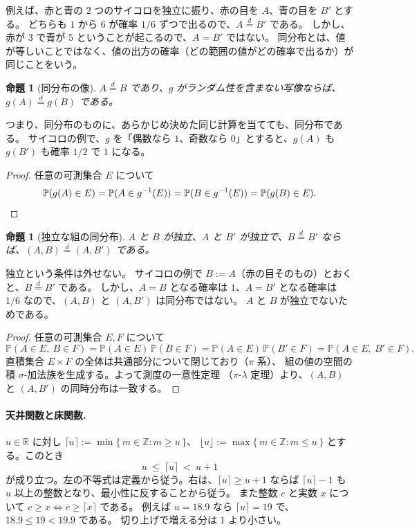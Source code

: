 \documentclass[a4paper,11pt]{jsarticle}
\theoremstyle{definition}
\theoremstyle{plain}
\newtheorem{proposition}[definition]{命題}
\theoremstyle{remark}
\newcommand{\Prob}{\mathbb{P}}
\newcommand{\Real}{\mathbb{R}}
\newcommand{\eqd}{\overset{d}{=}}               %
\begin{document}
例えば、赤と青の $2$ つのサイコロを独立に振り、赤の目を $A$、青の目を $B'$ とする。
どちらも $1$ から $6$ が確率 $1/6$ ずつで出るので、$A\eqd B'$ である。
しかし、赤が $3$ で青が $5$ ということが起こるので、$A=B'$ ではない。
同分布とは、値が等しいことではなく、値の出方の確率（どの範囲の値がどの確率で出るか）が同じことをいう。

\begin{proposition}[同分布の像]
  \label{prop:image}
  $A\eqd B$ であり、$g$ がランダム性を含まない写像ならば、$g(A)\eqd g(B)$ である。
\end{proposition}

つまり、同分布のものに、あらかじめ決めた同じ計算を当てても、同分布である。
サイコロの例で、$g$ を「偶数なら $1$、奇数なら $0$」とすると、$g(A)$ も $g(B')$ も確率 $1/2$ で $1$ になる。

\begin{proof}
  任意の可測集合 $E$ について
  \begin{equation*}
    \Prob(g(A)\in E)=\Prob(A\in g^{-1}(E))=\Prob(B\in g^{-1}(E))=\Prob(g(B)\in E).
    \qedhere
  \end{equation*}
\end{proof}

\begin{proposition}[独立な組の同分布]
  \label{prop:indep-pair}
  $A$ と $B$ が独立、$A$ と $B'$ が独立で、$B\eqd B'$ ならば、$(A,B)\eqd(A,B')$ である。
\end{proposition}

独立という条件は外せない。
サイコロの例で $B:=A$（赤の目そのもの）とおくと、$B\eqd B'$ である。
しかし、$A=B$ となる確率は $1$、$A=B'$ となる確率は $1/6$ なので、$(A,B)$ と $(A,B')$ は同分布ではない。
$A$ と $B$ が独立でないためである。

\begin{proof}
  任意の可測集合 $E,F$ について
  \begin{equation*}
    \Prob(A\in E,\ B\in F)=\Prob(A\in E)\,\Prob(B\in F)
    =\Prob(A\in E)\,\Prob(B'\in F)=\Prob(A\in E,\ B'\in F).
  \end{equation*}
  直積集合 $E\times F$ の全体は共通部分について閉じており（$\pi$ 系）、
  組の値の空間の積 $\sigma$-加法族を生成する。よって測度の一意性定理
  （$\pi$-$\lambda$ 定理）より、$(A,B)$ と $(A,B')$ の同時分布は一致する。
\end{proof}

\paragraph{天井関数と床関数.}
$u\in\Real$ に対し $\lceil u\rceil:=\min\{\,m\in\mathbb{Z}: m\ge u\,\}$、
$\lfloor u\rfloor:=\max\{\,m\in\mathbb{Z}: m\le u\,\}$ とする。このとき
\begin{equation}
  \label{eq:ceil-bounds}
  u\ \le\ \lceil u\rceil\ <\ u+1
\end{equation}
が成り立つ。左の不等式は定義から従う。右は、$\lceil u\rceil\ge u+1$ ならば
$\lceil u\rceil-1$ も $u$ 以上の整数となり、最小性に反することから従う。
また整数 $c$ と実数 $x$ について $c\ge x\iff c\ge\lceil x\rceil$ である。
例えば $u=18.9$ なら $\lceil u\rceil=19$ で、$18.9\le19<19.9$ である。
切り上げで増える分は $1$ より小さい。
\end{document}
